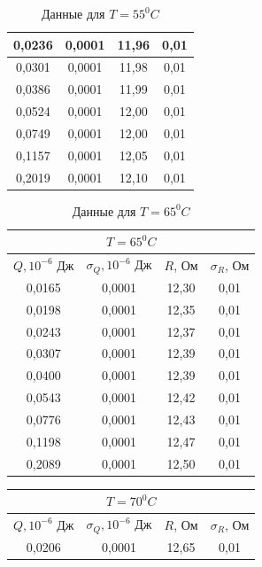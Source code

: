 \documentclass[a4paper, 12pt]{article}%
\begin{document}
\begin{enumerate}
\begin{table}[h]
\begin{center}
\begin{tabular}{|c|c|c|c|}
0,0236 & 0,0001 & 11,96 & 0,01 \\ \hline
0,0301 & 0,0001 & 11,98 & 0,01 \\ \hline
0,0386 & 0,0001 & 11,99 & 0,01 \\ \hline
0,0524 & 0,0001 & 12,00 & 0,01 \\ \hline
0,0749 & 0,0001 & 12,00 & 0,01 \\ \hline
0,1157 & 0,0001 & 12,05 & 0,01 \\ \hline
0,2019 & 0,0001 & 12,10 & 0,01 \\ \hline
\end{tabular}
\end{center}
\caption{Данные для $T = 55 ^0 C$}
\end{table}
\FloatBarrier
\FloatBarrier
\begin{table}[h]
\begin{center}
\begin{tabular}{|c|c|c|c|}
\hline
\multicolumn{4}{|c|}{$T = 65 ^0 C$} \\ \hline
$Q, 10^{-6}$ Дж & $\sigma_Q, 10^{-6}$ Дж & $R$, Ом & $\sigma_R$, Ом \\ \hline
0,0165 & 0,0001 & 12,30 & 0,01 \\ \hline
0,0198 & 0,0001 & 12,35 & 0,01 \\ \hline
0,0243 & 0,0001 & 12,37 & 0,01 \\ \hline
0,0307 & 0,0001 & 12,39 & 0,01 \\ \hline
0,0400 & 0,0001 & 12,39 & 0,01 \\ \hline
0,0543 & 0,0001 & 12,42 & 0,01 \\ \hline
0,0776 & 0,0001 & 12,43 & 0,01 \\ \hline
0,1198 & 0,0001 & 12,47 & 0,01 \\ \hline
0,2089 & 0,0001 & 12,50 & 0,01 \\ \hline
\end{tabular}
\end{center}
\caption{Данные для $T = 65 ^0 C$}
\end{table}
\FloatBarrier
\FloatBarrier
\begin{table}[h]
\begin{center}
\begin{tabular}{|c|c|c|c|}
\hline
\multicolumn{4}{|c|}{$T = 70 ^0 C$} \\ \hline
$Q, 10^{-6}$ Дж & $\sigma_Q, 10^{-6}$ Дж & $R$, Ом & $\sigma_R$, Ом \\ \hline
0,0206 & 0,0001 & 12,65 & 0,01 \\ \hline

\end{tabular}
\end{center}
\end{table}
\end{enumerate}
\end{document}
